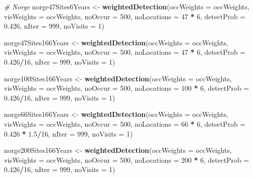 \documentclass[]{article}
\newenvironment{Shaded}{\begin{snugshade}}{\end{snugshade}}
\newcommand{\KeywordTok}[1]{\textcolor[rgb]{0.13,0.29,0.53}{\textbf{#1}}}
\newcommand{\DataTypeTok}[1]{\textcolor[rgb]{0.13,0.29,0.53}{#1}}
\newcommand{\DecValTok}[1]{\textcolor[rgb]{0.00,0.00,0.81}{#1}}
\newcommand{\FloatTok}[1]{\textcolor[rgb]{0.00,0.00,0.81}{#1}}
\newcommand{\StringTok}[1]{\textcolor[rgb]{0.31,0.60,0.02}{#1}}
\newcommand{\CommentTok}[1]{\textcolor[rgb]{0.56,0.35,0.01}{\textit{#1}}}
\newcommand{\OperatorTok}[1]{\textcolor[rgb]{0.81,0.36,0.00}{\textbf{#1}}}
\newcommand{\NormalTok}[1]{#1}
\begin{document}
\begin{Shaded}
\begin{Highlighting}[]
\CommentTok{# Norge}
\NormalTok{norge47Sites6Years <-}\StringTok{ }\KeywordTok{weightedDetection}\NormalTok{(}\DataTypeTok{occWeights =}\NormalTok{ occWeights, }\DataTypeTok{visWeights =}\NormalTok{ occWeights, }
    \DataTypeTok{noOccur =} \DecValTok{500}\NormalTok{, }\DataTypeTok{noLocations =} \DecValTok{47} \OperatorTok{*}\StringTok{ }\DecValTok{6}\NormalTok{, }\DataTypeTok{detectProb =} \FloatTok{0.426}\NormalTok{, }\DataTypeTok{nIter =} \DecValTok{999}\NormalTok{, }\DataTypeTok{noVisits =} \DecValTok{1}\NormalTok{)}

\NormalTok{norge47Sites166Years <-}\StringTok{ }\KeywordTok{weightedDetection}\NormalTok{(}\DataTypeTok{occWeights =}\NormalTok{ occWeights, }\DataTypeTok{visWeights =}\NormalTok{ occWeights, }
    \DataTypeTok{noOccur =} \DecValTok{500}\NormalTok{, }\DataTypeTok{noLocations =} \DecValTok{47} \OperatorTok{*}\StringTok{ }\DecValTok{6}\NormalTok{, }\DataTypeTok{detectProb =} \FloatTok{0.426}\OperatorTok{/}\DecValTok{16}\NormalTok{, }\DataTypeTok{nIter =} \DecValTok{999}\NormalTok{, }
    \DataTypeTok{noVisits =} \DecValTok{1}\NormalTok{)}

\NormalTok{norge100Sites166Years <-}\StringTok{ }\KeywordTok{weightedDetection}\NormalTok{(}\DataTypeTok{occWeights =}\NormalTok{ occWeights, }\DataTypeTok{visWeights =}\NormalTok{ occWeights, }
    \DataTypeTok{noOccur =} \DecValTok{500}\NormalTok{, }\DataTypeTok{noLocations =} \DecValTok{100} \OperatorTok{*}\StringTok{ }\DecValTok{6}\NormalTok{, }\DataTypeTok{detectProb =} \FloatTok{0.426}\OperatorTok{/}\DecValTok{16}\NormalTok{, }\DataTypeTok{nIter =} \DecValTok{999}\NormalTok{, }
    \DataTypeTok{noVisits =} \DecValTok{1}\NormalTok{)}


\NormalTok{norge66Sites166Years <-}\StringTok{ }\KeywordTok{weightedDetection}\NormalTok{(}\DataTypeTok{occWeights =}\NormalTok{ occWeights, }\DataTypeTok{visWeights =}\NormalTok{ occWeights, }
    \DataTypeTok{noOccur =} \DecValTok{500}\NormalTok{, }\DataTypeTok{noLocations =} \DecValTok{66} \OperatorTok{*}\StringTok{ }\DecValTok{6}\NormalTok{, }\DataTypeTok{detectProb =} \FloatTok{0.426} \OperatorTok{*}\StringTok{ }\FloatTok{1.5}\OperatorTok{/}\DecValTok{16}\NormalTok{, }\DataTypeTok{nIter =} \DecValTok{999}\NormalTok{, }
    \DataTypeTok{noVisits =} \DecValTok{1}\NormalTok{)}

\NormalTok{norge200Sites166Years <-}\StringTok{ }\KeywordTok{weightedDetection}\NormalTok{(}\DataTypeTok{occWeights =}\NormalTok{ occWeights, }\DataTypeTok{visWeights =}\NormalTok{ occWeights, }
    \DataTypeTok{noOccur =} \DecValTok{500}\NormalTok{, }\DataTypeTok{noLocations =} \DecValTok{200} \OperatorTok{*}\StringTok{ }\DecValTok{6}\NormalTok{, }\DataTypeTok{detectProb =} \FloatTok{0.426}\OperatorTok{/}\DecValTok{16}\NormalTok{, }\DataTypeTok{nIter =} \DecValTok{999}\NormalTok{, }
    \DataTypeTok{noVisits =} \DecValTok{1}\NormalTok{)}




\end{Highlighting}
\end{Shaded}
\end{document}
